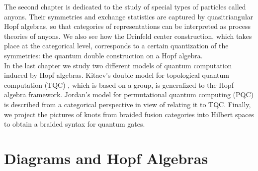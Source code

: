 \documentclass{article}
\begin{document}
The second chapter is dedicated to the study of special types of particles called anyons. Their symmetries and exchange statistics are captured by quasitriangular Hopf algebras, so that categories of representations can be interpreted as process theories of anyons. We also see how the Drinfeld center construction, which takes place at the categorical level, corresponds to a certain quantization of the symmetries: the quantum double construction on a Hopf algebra.\\
In the last chapter we study two different models of quantum computation induced by Hopf algebras. 
Kitaev's double model for topological quantum computation (TQC) \cite{Kitaev03}, which is based on a group, is generalized to the Hopf algebra framework. 
Jordan's model for permutational quantum computing (PQC) \cite{Jordan09} is described from a categorical perspective in view of relating it to TQC. 
Finally, we project the pictures of knots from braided fusion categories into Hilbert spaces to obtain a braided syntax for quantum gates. 

\section{Diagrams and Hopf Algebras}\label{Diagramsandhopfalgebras}
\end{document}
